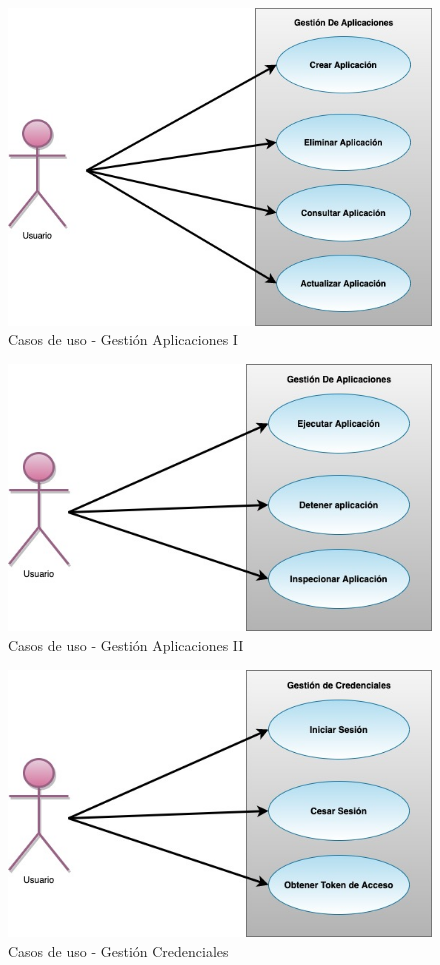 \documentclass[a4paper,11pt]{book}
\begin{document}
\begin{figure}[H]
\centering
\includegraphics[scale=0.50]{imagenes/casosUso1.jpg}
\caption{ Casos de uso - Gestión Aplicaciones I\cite{diagrama}  }
\end{figure}

\begin{figure}[H]
\centering
\includegraphics[scale=0.50]{imagenes/casosUso2.jpg}
\caption{ Casos de uso - Gestión Aplicaciones II\cite{diagrama}  }
\end{figure}

\begin{figure}[H]
\centering
\includegraphics[scale=0.50]{imagenes/casosUso3.jpg}
\caption{ Casos de uso - Gestión Credenciales\cite{diagrama}  }
\end{figure}
\end{document}
